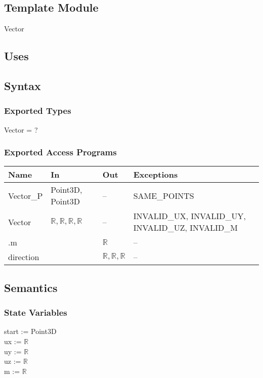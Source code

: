 \documentclass[12pt, titlepage]{article}
\begin{document}
\subsection{Template Module}
Vector

\subsection{Uses}

\subsection{Syntax}
\subsubsection{Exported Types}
Vector = ?
\subsubsection{Exported Access Programs}
\begin{center}
	\begin{tabular}{p{4cm} p{2cm} p{2cm} p{4cm}}
		\hline
		\textbf{Name} & \textbf{In} & \textbf{Out} & \textbf{Exceptions} \\
		\hline
		Vector\_P & Point3D, Point3D & -- & SAME\_POINTS \\
		Vector & $ \mathbb{R},\mathbb{R},\mathbb{R},\mathbb{R} $ & -- & 
		INVALID\_UX, INVALID\_UY, INVALID\_UZ, INVALID\_M \\
		.m & & $\mathbb{R}$ & -- \\
		direction & & $ \mathbb{R},\mathbb{R},\mathbb{R}$  & -- 
		\\	
		\hline
	\end{tabular}
\end{center}

\subsection{Semantics}
\subsubsection{State Variables}
start := Point3D \\
ux := $\mathbb{R}$ \\
uy := $\mathbb{R}$ \\
uz := $\mathbb{R}$ \\
m := $\mathbb{R}$ \\ 
\end{document}
